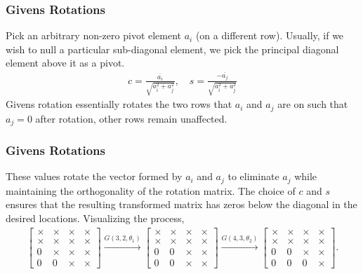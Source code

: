 \documentclass{beamer}
\theoremstyle{remark}
\numberwithin{equation}{section}
\begin{document}
      \begin{frame}
        \frametitle{Givens Rotations}
        Pick an arbitrary non-zero pivot element $a_i$ (on a different row). Usually, if we wish to null a particular sub-diagonal element, we pick the principal diagonal element above it as a pivot.
        \begin{align*}
          c = \frac{\overline{a_{i}}}{\sqrt{a_{i}^2 + a_{j}^2}}, \quad s = \frac{-\overline{a_{j}}}{\sqrt{a_{i}^2 + a_{j}^2}}
        \end{align*}
        Givens rotation essentially rotates the two rows that $a_i$ and $a_j$ are on such that $a_j = 0$ after rotation, other rows remain unaffected. 

      \end{frame}
      \begin{frame}
        \frametitle{Givens Rotations}
        These values rotate the vector formed by $a_{i}$ and $a_{j}$ to eliminate $a_{j}$ while maintaining the orthogonality of the rotation matrix. The choice of $c$ and $s$ ensures that the resulting transformed matrix has zeros below the diagonal in the desired locations.
        Visualizing the process,
        {\small
        \begin{align}
          \begin{bmatrix}
            \times & \times & \times & \times \\
            \times & \times & \times & \times \\
            0 & \times & \times & \times \\
            0 & 0 & \times & \times
          \end{bmatrix}
          \xrightarrow{G(3,2,\theta_1)}
          \begin{bmatrix}
            \times & \times & \times & \times \\
            \times & \times & \times & \times \\
            0 & 0 & \times & \times \\
            0 & 0 & \times & \times
          \end{bmatrix}
          \xrightarrow{G(4,3,\theta_2)}
          \begin{bmatrix}
            \times & \times & \times & \times \\
            \times & \times & \times & \times \\
            0 & 0 & \times & \times \\
            0 & 0 & 0 & \times
          \end{bmatrix}.

\end{align}}
\end{frame}
\end{document}
